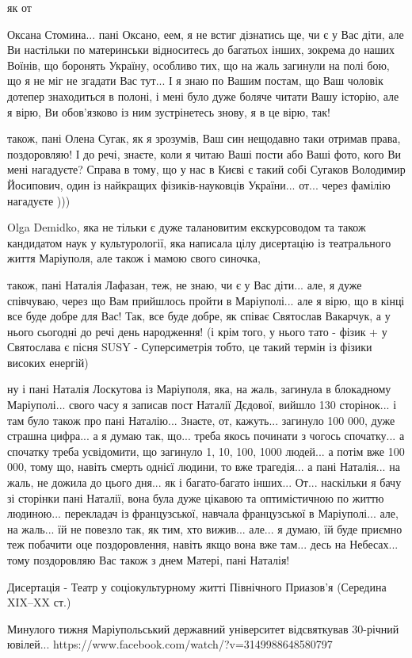 як от

Оксана Стомина... пані Оксано, еем, я не встиг дізнатись ще, чи є у Вас діти,
але Ви настільки по материнськи відноситесь до багатьох інших, зокрема до наших
Воїнів, що боронять Україну, особливо тих, що на жаль загинули на полі бою, що
я не міг не згадати Вас тут... І я знаю по Вашим постам, що Ваш чоловік дотепер
знаходиться в полоні, і мені було дуже боляче читати Вашу історію, але я вірю,
Ви обов'язково із ним зустрінетесь знову, я в це вірю, так!

також, пані Олена Сугак, як я зрозумів, Ваш син нещодавно таки отримав права,
поздоровляю!  І до речі, знаєте, коли я читаю Ваші пости або Ваші фото, кого Ви
мені нагадуєте? Справа в тому, що у нас в Києві є такий собі Сугаков Володимир
Йосипович, один із найкращих фізиків-науковців України...  от... через фамілію нагадуєте
)))  

Olga Demidko, яка не тільки є дуже талановитим екскурсоводом та також
кандидатом наук у культурології, яка написала цілу дисертацію із театрального
життя Маріуполя, але також і мамою свого синочка,

також, пані Наталія Лафазан, теж, не знаю, чи є у Вас діти...
але, я дуже співчуваю, через що Вам прийшлось пройти в Маріуполі...
але я вірю, що в кінці все буде добре для Вас! Так, все буде добре,
як співає Святослав Вакарчук, а у нього сьогодні до речі день народження! 
(і крім того, у нього тато - фізик + у Святослава є пісня SUSY - Суперсиметрія тобто, це такий термін
із фізики високих енергій)

ну і пані Наталія Лоскутова із Маріуполя, яка, на жаль, загинула в блокадному Маріуполі...
свого часу я записав пост Наталії Дєдової, вийшло 130 сторінок... і там було також про пані Наталію...
Знаєте, от, кажуть... загинуло 100 000, дуже страшна цифра... а я думаю так, що...
треба якось починати з чогось спочатку... а спочатку треба усвідомити, що загинуло
1, 10, 100, 1000 людей... а потім вже 100 000, тому що, навіть смерть однієї людини,
то вже трагедія... а пані Наталія... на жаль, не дожила до цього дня... як і багато-багато інших...
От... наскільки я бачу зі сторінки пані Наталії, вона була дуже цікавою та оптимістичною по життю людиною...
перекладач із французської, навчала французської в Маріуполі... але, на жаль... їй не повезло
так, як тим, хто вижив... але... я думаю, їй буде приємно теж побачити оце поздоровлення,
навіть якщо вона вже там... десь на Небесах... тому поздоровляю Вас також з днем Матері, пані Наталія!

Дисертація - Театр у соціокультурному житті Північного Приазов'я (Середина XIX–XX ст.)

Минулого тижня Маріупольський державний університет відсвяткував 30-річний ювілей...
https://www.facebook.com/watch/?v=3149988648580797


